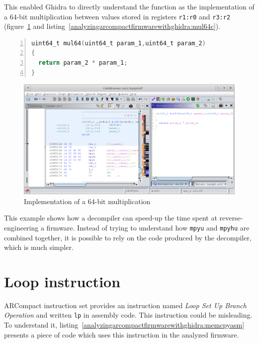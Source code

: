 This enabled Ghidra to directly understand the function as the implementation of a 64-bit multiplication between values stored in registers \texttt{r1:r0} and \texttt{r3:r2} (figure~\ref{fig:analyzingarcompactfirmwarewithghidra:mul64} and listing~\ref{analyzingarcompactfirmwarewithghidra:mul64c}).

\begin{lstlisting}[language=C, numbers=left, caption={Decompiled output of the function given in listing~\ref{analyzingarcompactfirmwarewithghidra:mul64asm}}, label=analyzingarcompactfirmwarewithghidra:mul64c]
uint64_t mul64(uint64_t param_1,uint64_t param_2)
{
  return param_2 * param_1;
}
\end{lstlisting}

\begin{figure}[ht]
  \centering
  \includegraphics[width=\textwidth]{AnalyzingARCompactFirmwareWithGhidra/img/mul64}
  \caption{Implementation of a 64-bit multiplication}
  \label{fig:analyzingarcompactfirmwarewithghidra:mul64}
\end{figure}

This example shows how a decompiler can speed-up the time spent at
reverse-engineering a firmware. Instead of trying to understand how
\texttt{mpyu} and \texttt{mpyhu} are
combined together, it is possible to rely on the code produced by the
decompiler, which is much simpler.

\section{Loop instruction}

ARCompact instruction set provides an instruction named \emph{Loop Set
Up Branch Operation} and written \texttt{lp} in
assembly code. This instruction could be misleading. To understand it,
listing~\ref{analyzingarcompactfirmwarewithghidra:memcpyasm} presents a
piece of code which uses this instruction in the analyzed firmware.

